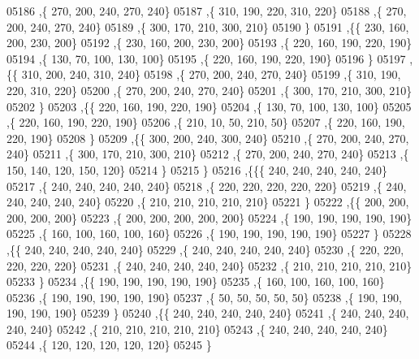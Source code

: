 \begin{DoxyCode}
05186     ,\{   270,   200,   240,   270,   240\}
05187     ,\{   310,   190,   220,   310,   220\}
05188     ,\{   270,   200,   240,   270,   240\}
05189     ,\{   300,   170,   210,   300,   210\}
05190     \}
05191    ,\{\{   230,   160,   200,   230,   200\}
05192     ,\{   230,   160,   200,   230,   200\}
05193     ,\{   220,   160,   190,   220,   190\}
05194     ,\{   130,    70,   100,   130,   100\}
05195     ,\{   220,   160,   190,   220,   190\}
05196     \}
05197    ,\{\{   310,   200,   240,   310,   240\}
05198     ,\{   270,   200,   240,   270,   240\}
05199     ,\{   310,   190,   220,   310,   220\}
05200     ,\{   270,   200,   240,   270,   240\}
05201     ,\{   300,   170,   210,   300,   210\}
05202     \}
05203    ,\{\{   220,   160,   190,   220,   190\}
05204     ,\{   130,    70,   100,   130,   100\}
05205     ,\{   220,   160,   190,   220,   190\}
05206     ,\{   210,    10,    50,   210,    50\}
05207     ,\{   220,   160,   190,   220,   190\}
05208     \}
05209    ,\{\{   300,   200,   240,   300,   240\}
05210     ,\{   270,   200,   240,   270,   240\}
05211     ,\{   300,   170,   210,   300,   210\}
05212     ,\{   270,   200,   240,   270,   240\}
05213     ,\{   150,   140,   120,   150,   120\}
05214     \}
05215    \}
05216   ,\{\{\{   240,   240,   240,   240,   240\}
05217     ,\{   240,   240,   240,   240,   240\}
05218     ,\{   220,   220,   220,   220,   220\}
05219     ,\{   240,   240,   240,   240,   240\}
05220     ,\{   210,   210,   210,   210,   210\}
05221     \}
05222    ,\{\{   200,   200,   200,   200,   200\}
05223     ,\{   200,   200,   200,   200,   200\}
05224     ,\{   190,   190,   190,   190,   190\}
05225     ,\{   160,   100,   160,   100,   160\}
05226     ,\{   190,   190,   190,   190,   190\}
05227     \}
05228    ,\{\{   240,   240,   240,   240,   240\}
05229     ,\{   240,   240,   240,   240,   240\}
05230     ,\{   220,   220,   220,   220,   220\}
05231     ,\{   240,   240,   240,   240,   240\}
05232     ,\{   210,   210,   210,   210,   210\}
05233     \}
05234    ,\{\{   190,   190,   190,   190,   190\}
05235     ,\{   160,   100,   160,   100,   160\}
05236     ,\{   190,   190,   190,   190,   190\}
05237     ,\{    50,    50,    50,    50,    50\}
05238     ,\{   190,   190,   190,   190,   190\}
05239     \}
05240    ,\{\{   240,   240,   240,   240,   240\}
05241     ,\{   240,   240,   240,   240,   240\}
05242     ,\{   210,   210,   210,   210,   210\}
05243     ,\{   240,   240,   240,   240,   240\}
05244     ,\{   120,   120,   120,   120,   120\}
05245     \}

\end{DoxyCode}
